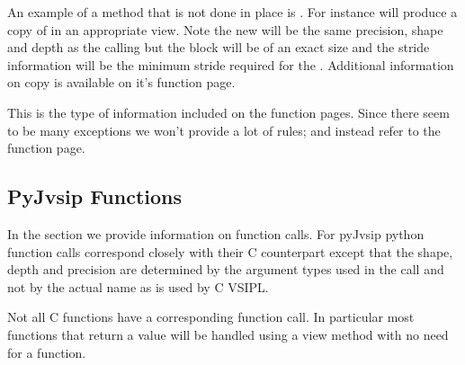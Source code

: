 An example of a  method that is not done in place is . For instance  will produce a copy of  in an appropriate view. Note the new  will be the same precision, shape and depth as the calling  but the \ttbf block will be of an exact size and the stride information will be the minimum stride required for the . Additional information on copy is available on it's function page.

This is the type of information included on the function pages. Since there seem to be many exceptions we won't provide a lot of rules; and instead refer to the function page.

\subsection*{PyJvsip Functions}
In the \pyjv {} section we provide information on function calls. For pyJvsip python function calls correspond closely with their C counterpart except that the shape, depth and precision are determined by the argument types used in the call and not by the actual name as is used by C VSIPL.

Not all C functions have a corresponding \pyjv function call. In particular most functions that return a value will be handled using a view method with no need for a function.
 














